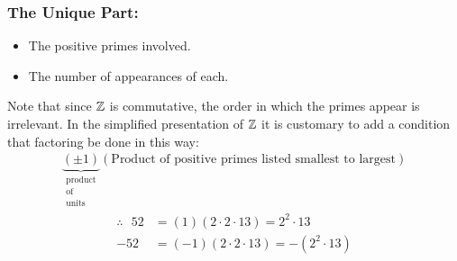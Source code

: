 \subsubsection*{The Unique Part:}
\begin{itemize}
    \item The positive primes involved.
    \item The number of appearances of each.
\end{itemize}
Note that since ${\mathbb{ Z}}$ is commutative, the order in which the primes appear is irrelevant. In the simplified presentation of ${\mathbb{ Z}}$ it is customary to add a condition that factoring be done in this way:
\begin{align*}
    \underbrace{(\pm 1)}_{\substack{\text{product}\\ \text{of} \\ \text{units}}}(\text{Product of positive primes listed smallest to largest})
\end{align*}
\begin{align*}
    \therefore \ \ \ 52&= (1)(2\cdot 2\cdot 13) = 2^2 \cdot 13 \\
    -52 &= (-1)(2\cdot 2\cdot 13 )= -(2^2\cdot 13)
\end{align*}
\setcounter{dummy}{1}
